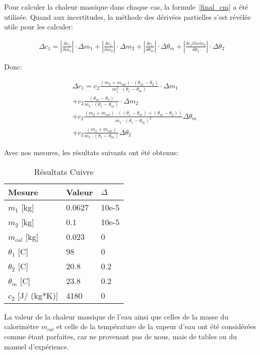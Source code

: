 Pour calculer la chaleur massique dans chaque cas, la formule~\eqref{final_cm} a été utilisée.
Quand aux incertitudes, la méthode des dérivées partielles s'est révélée utile pour les calculer:

\begin{align*}
    \Delta c_1 = |\frac{\delta c_1}{\delta m_1}|\cdot \Delta m_1 + |\frac{\delta c_1}{\delta m_2}|\cdot \Delta m_2 + |\frac{\delta c_1}{\delta \theta_m}|\cdot \Delta \theta_m + |\frac{\delta c_1theta_2}{\delta \theta_2}|\cdot \Delta \theta_2
\end{align*}

Donc:

\begin{align*}
    &\Delta c_1 = c_2 \frac{(m_2 + m_{cal})\cdot (\theta_m - \theta_2)}{m_1^2 \cdot (\theta_1 - \theta_m)}\cdot \Delta m_1\\
    &+ c_2 \frac{(\theta_m - \theta_2)}{m_1\cdot (\theta_1 - \theta_m)}\cdot \Delta m_2\\
    &+ c_2 \frac{(m_2 + m_{cal})\cdot ((\theta_1 - \theta_m)+(\theta_m - \theta_2))}{m_1 \cdot (\theta_1 - \theta_m)^2} \Delta \theta_m\\
    &+ c_2 \frac{(m_2 + m_{cal})}{m_1 \cdot (\theta_1 - \theta_m)}\Delta \theta_2
\end{align*}

Avec nos mesures, les résultats suivants ont été obtenus:

\begin{table}[!h]
    \centering
    \caption{Résultats Cuivre}
    \begin{tabular}{|l|l|l|}
	\hline
	Mesure	&Valeur	&$\Delta$\\
	\hline
	$m_1$ [kg]	&0.0627	&10e-5\\
	$m_2$ [kg]	&0.1	&10e-5\\
	$m_{cal}$ [kg]	&0.023	&0\\
	$\theta_1$ [C\degree]	&98	&0\\
	$\theta_2$ [C\degree]	&20.8	&0.2\\
	$\theta_m$ [C\degree]	&23.8	&0.2\\
	$c_2$ [J/ (kg*K)]	&4180	&0\\
	\hline
    \end{tabular}
\end{table}

La valeur de la chaleur massique de l'eau ainsi que celles de la masse du calorimètre $m_{cal}$ et celle de la température de la vapeur d'eau ont été considérées comme étant parfaites, car ne provenant pas de nous, mais de tables ou du manuel d'expérience.

